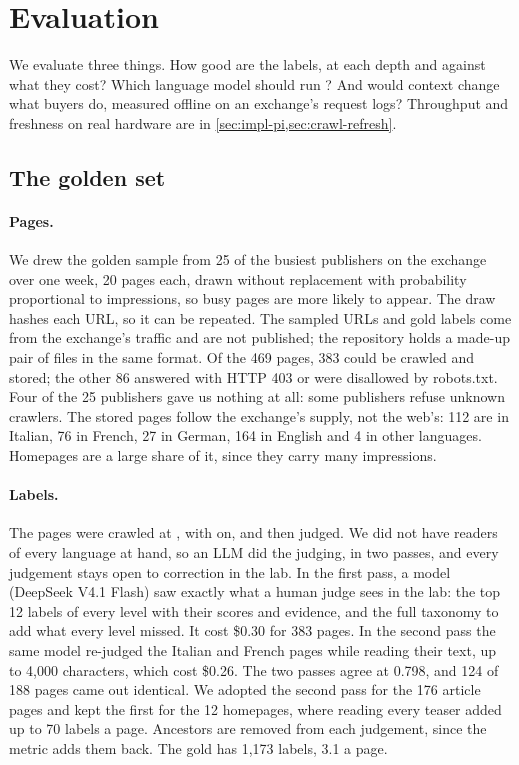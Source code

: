 \section{Evaluation}\label{sec:eval}

We evaluate three things. How good are the labels, at each depth and against what they cost? Which language model should run ? And would context change what buyers do, measured offline on an exchange's request logs? Throughput and freshness on real hardware are in \cref{sec:impl-pi,sec:crawl-refresh}.

\subsection{The golden set}\label{sec:eval-golden}

\paragraph{Pages.} We drew the golden sample from 25 of the busiest publishers on the exchange over one week, 20 pages each, drawn without replacement with probability proportional to impressions, so busy pages are more likely to appear. The draw hashes each URL, so it can be repeated. The sampled URLs and gold labels come from the exchange's traffic and are not published; the repository holds a made-up pair of files in the same format. Of the 469 pages, 383 could be crawled and stored; the other 86 answered with HTTP 403 or were disallowed by robots.txt. Four of the 25 publishers gave us nothing at all: some publishers refuse unknown crawlers. The stored pages follow the exchange's supply, not the web's: 112 are in Italian, 76 in French, 27 in German, 164 in English and 4 in other languages. Homepages are a large share of it, since they carry many impressions.

\paragraph{Labels.} The pages were crawled at , with  on, and then judged. We did not have readers of every language at hand, so an LLM did the judging, in two passes, and every judgement stays open to correction in the lab. In the first pass, a model (DeepSeek V4.1 Flash) saw exactly what a human judge sees in the lab: the top 12 labels of every level with their scores and evidence, and the full taxonomy to add what every level missed. It cost \$0.30 for 383 pages. In the second pass the same model re-judged the Italian and French pages while reading their text, up to 4,000 characters, which cost \$0.26. The two passes agree at \hF{} 0.798, and 124 of 188 pages came out identical. We adopted the second pass for the 176 article pages and kept the first for the 12 homepages, where reading every teaser added up to 70 labels a page. Ancestors are removed from each judgement, since the metric adds them back. The gold has 1,173 labels, 3.1 a page.

